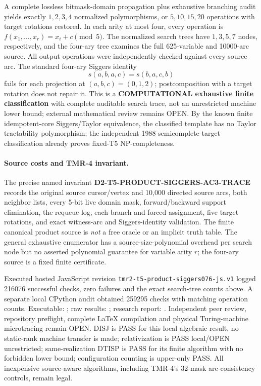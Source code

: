 \documentclass[11pt]{article}
\begin{document}
A complete lossless bitmask-domain propagation plus exhaustive
branching audit yields exactly $1,2,3,4$ normalized
polymorphisms, or $5,10,15,20$ operations with target
rotations restored. In each arity at most four, every operation
is $f(x_1,\ldots,x_r)=x_i+c\pmod5$.
The normalized search trees have $1,3,5,7$ nodes, respectively,
and the four-ary tree examines the full 625-variable and
10000-arc source. All output operations were independently
checked against every source arc. The standard four-ary
Siggers identity
\[
s(a,b,a,c)=s(b,a,c,b)
\]
fails for each projection at $(a,b,c)=(0,1,2)$; postcomposition
with a target rotation does not repair it. This is a
\textbf{COMPUTATIONAL exhaustive finite classification}
with complete auditable search trace, not an unrestricted
machine lower bound; external mathematical review remains OPEN.
By the known finite idempotent-core Siggers/Taylor equivalence,
the classified template has no Taylor tractability polymorphism;
the independent 1988 semicomplete-target classification already
proves fixed-T5 NP-completeness.

\paragraph{Source costs and TMR-4 invariant.}
The precise named invariant
\textbf{D2-T5-PRODUCT-SIGGERS-AC3-TRACE}
records the original source cursor/vertex and 10,000 directed
source arcs, both neighbor lists, every 5-bit live domain mask,
forward/backward support elimination, the requeue log, each
branch and forced assignment, five target rotations, and exact
witness-arc and Siggers-identity validation. The finite
canonical product source is \emph{not} a free oracle or an
implicit truth table. The general exhaustive enumerator
has a source-size-polynomial overhead per search node but
no asserted polynomial guarantee for variable arity $r$;
the four-ary source is a fixed finite certificate.

Executed hosted JavaScript revision
\texttt{tmr2-t5-product-siggers076-js.v1} logged
216076 successful checks, zero failures and the exact
search-tree counts above. A separate local CPython audit
obtained 259295 checks with matching operation counts.
Executable:
;
raw results:
;
research report:
.
Independent peer review, repository preflight, complete LaTeX
compilation and physical Turing-machine microtracing remain OPEN.
DISJ is PASS for this local algebraic result, no static-rank
machine transfer is made; relativization is PASS local/OPEN
unrestricted; same-realization DTISP is PASS for its finite
algorithm with no forbidden lower bound; configuration counting
is upper-only PASS. All inexpensive source-aware algorithms,
including TMR-4's 32-mask arc-consistency controls, remain legal.
\end{document}
